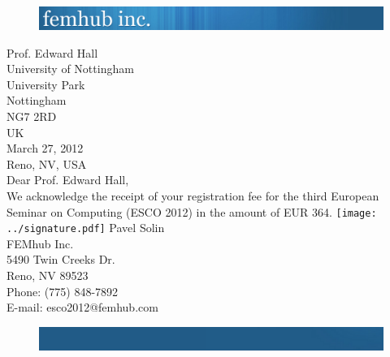 \documentclass{article}
\begin{document}
\vbox{}
\vspace{-2cm}
\begin{figure}[!ht]
\includegraphics[width=\textwidth]{../femhub_logo.png}
\vspace{1cm}
\end{figure}
\noindent
Prof. Edward Hall\\
University of Nottingham\\
University Park\\
Nottingham\\
NG7 2RD\\
UK\\

\noindent
\hbox{} \hfill March 27, 2012\\
\hbox{} \hfill Reno, NV, USA\\
Dear Prof. Edward Hall,\\
\newline
\noindent
We acknowledge the receipt of your registration fee for the 
third European Seminar on Computing (ESCO 2012) in 
the amount of EUR 364.
\newline
\vspace{1cm}
\newline
\hbox{}
\hspace{-4mm}
\texttt{[image: ../signature.pdf]}
\newline
\noindent
Pavel Solin\\
FEMhub Inc.\\
5490 Twin Creeks Dr.\\
Reno, NV 89523\\
Phone: (775) 848-7892\\
E-mail: esco2012@femhub.com
\begin{figure}[!ht]
\includegraphics[width=\textwidth]{../femhub_footer.png}
\vspace{1cm}
\end{figure}
\end{document}
